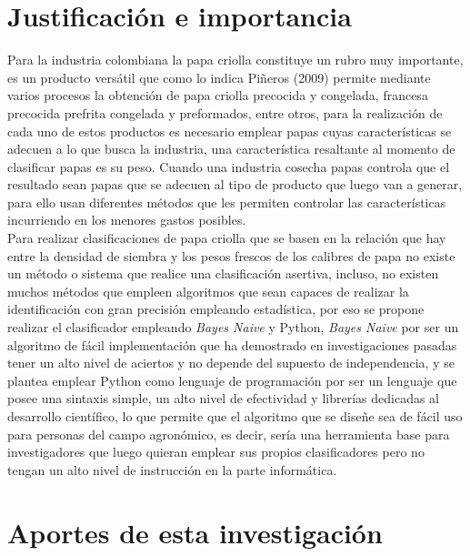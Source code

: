 \section{Justificaci\'on e importancia}

Para la industria colombiana la papa criolla constituye un rubro muy importante, es un producto versátil que como lo indica Piñeros (2009) permite mediante varios procesos la obtención de papa criolla precocida y congelada, francesa precocida prefrita congelada y preformados, entre otros, para la realización de cada uno de estos productos es necesario emplear papas cuyas características se adecuen a lo que busca la industria, una característica resaltante al momento de clasificar papas es su peso. Cuando una industria cosecha papas controla que el resultado sean papas que se adecuen al tipo de producto que luego van a generar, para ello usan diferentes métodos que les permiten controlar las características incurriendo en los menores gastos posibles.\\

Para realizar clasificaciones de papa criolla que se basen en la relación que hay entre la densidad de siembra y los pesos frescos de los calibres de papa no existe un método o sistema que realice una clasificación asertiva, incluso, no existen muchos métodos que empleen algoritmos que sean capaces de realizar la identificación con gran precisión empleando estadística, por eso se propone realizar el clasificador empleando \textit{Bayes Naive} y Python, \textit{Bayes Naive} por ser un algoritmo de fácil implementación que ha demostrado en investigaciones pasadas tener un alto nivel de aciertos y no depende del supuesto de independencia, y se plantea emplear Python como lenguaje de programación por ser un lenguaje que posee una sintaxis simple, un alto nivel de efectividad y librerías dedicadas al desarrollo científico, lo que permite que el algoritmo que se diseñe sea de fácil uso para personas del campo agronómico, es decir, sería una herramienta base para investigadores que luego quieran emplear sus propios clasificadores pero no tengan un alto nivel de instrucción en la parte informática.

\section{Aportes de esta investigación}

